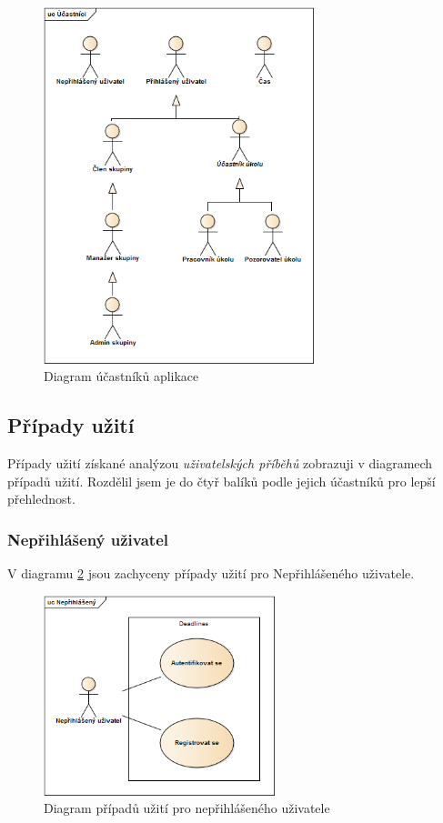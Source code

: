 \documentclass[thesis=B,czech]{FITthesis}[2012/06/26]
\begin{document}
			\begin{figure}\centering
				\includegraphics[width=0.7\textwidth]{ea-diagrams/uc-actors.png}
				\caption[Diagram účastníků]{Diagram účastníků aplikace}
				\label{diagram:actors}
			\end{figure}
			
			
			
		\subsection{Případy užití}
			\label{sec:usecases}
			Případy užití získané analýzou \textit{uživatelských příběhů} zobrazuji v diagramech případů užití. Rozdělil jsem je do čtyř balíků podle jejich účastníků pro lepší přehlednost.
			
			\subsubsection{Nepřihlášený uživatel}
			V diagramu \ref{diagram:uc-unauthorized} jsou zachyceny případy užití pro Nepřihlášeného uživatele.
			\begin{figure}\centering
				\includegraphics[width=0.6\textwidth]{ea-diagrams/uc-unauthorized.png}
				\caption[Případy užití nepřihlášených uživatelů]{Diagram případů užití pro nepřihlášeného uživatele}
				\label{diagram:uc-unauthorized}
			\end{figure}
			
\end{document}
